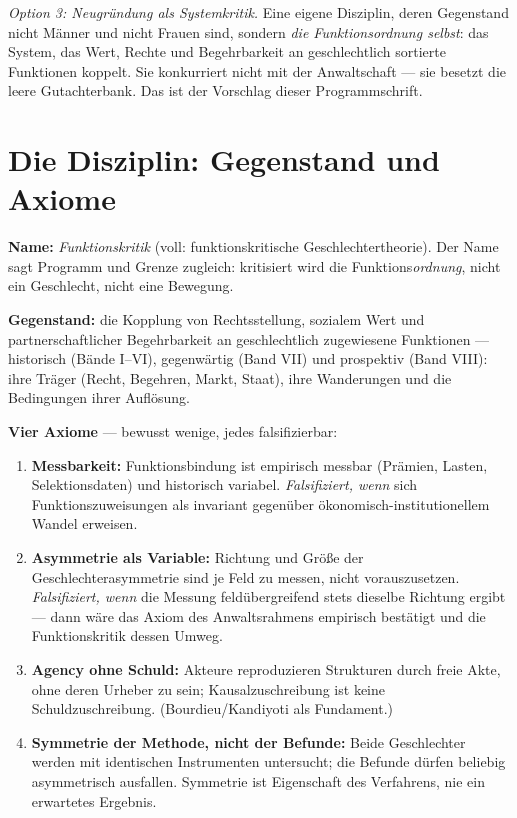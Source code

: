 \emph{Option 3: Neugründung als Systemkritik.} Eine eigene Disziplin, deren
Gegenstand nicht Männer und nicht Frauen sind, sondern \emph{die
Funktionsordnung selbst}: das System, das Wert, Rechte und Begehrbarkeit an
geschlechtlich sortierte Funktionen koppelt. Sie konkurriert nicht mit der
Anwaltschaft --- sie besetzt die leere Gutachterbank. Das ist der Vorschlag
dieser Programmschrift.

\section{Die Disziplin: Gegenstand und Axiome}

\textbf{Name:} \emph{Funktionskritik} (voll: funktionskritische
Geschlechtertheorie). Der Name sagt Programm und Grenze zugleich: kritisiert
wird die Funktions\emph{ordnung}, nicht ein Geschlecht, nicht eine Bewegung.

\textbf{Gegenstand:} die Kopplung von Rechtsstellung, sozialem Wert und
partnerschaftlicher Begehrbarkeit an geschlechtlich zugewiesene Funktionen ---
historisch (Bände I--VI), gegenwärtig (Band VII) und prospektiv (Band VIII):
ihre Träger (Recht, Begehren, Markt, Staat), ihre Wanderungen und die
Bedingungen ihrer Auflösung.

\textbf{Vier Axiome} --- bewusst wenige, jedes falsifizierbar:

\begin{enumerate}
\item \textbf{Messbarkeit:} Funktionsbindung ist empirisch messbar (Prämien,
Lasten, Selektionsdaten) und historisch variabel. \emph{Falsifiziert, wenn}
sich Funktionszuweisungen als invariant gegenüber ökonomisch-institutionellem
Wandel erweisen.
\item \textbf{Asymmetrie als Variable:} Richtung und Größe der
Geschlechterasymmetrie sind je Feld zu messen, nicht vorauszusetzen.
\emph{Falsifiziert, wenn} die Messung feldübergreifend stets dieselbe Richtung
ergibt --- dann wäre das Axiom des Anwaltsrahmens empirisch bestätigt und die
Funktionskritik dessen Umweg.
\item \textbf{Agency ohne Schuld:} Akteure reproduzieren Strukturen durch
freie Akte, ohne deren Urheber zu sein; Kausalzuschreibung ist keine
Schuldzuschreibung. (Bourdieu/Kandiyoti als Fundament.)
\item \textbf{Symmetrie der Methode, nicht der Befunde:} Beide Geschlechter
werden mit identischen Instrumenten untersucht; die Befunde dürfen beliebig
asymmetrisch ausfallen. Symmetrie ist Eigenschaft des Verfahrens, nie ein
erwartetes Ergebnis.
\end{enumerate}

